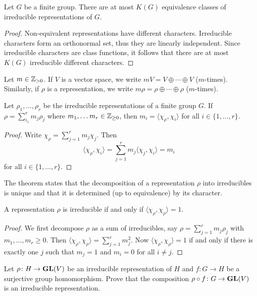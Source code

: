 \begin{corollary}
    Let $G$ be a finite group. There are at most $K(G)$ equivalence classes of irreducible representations of $G$.
\end{corollary}

\begin{proof}
    Non-equivalent representations have different characters. 
    Irreducible characters 
    form an orthonormal set, thus they are linearly 
    independent. Since irreducible characters
    are class functions, it follows that there are at most $K(G)$ irreducible different characters.  
\end{proof}

Let $m\in\mathbb{Z}_{>0}$. If $V$ is a vector space, we 
write $mV=V\oplus\cdots\oplus V$ ($m$-times). Similarly,
if $\rho$ is a representation, 
we write $m\rho=\rho\oplus\cdots\oplus\rho$ ($m$-times). 

\begin{theorem}
    Let $\rho_1,\dots,\rho_r$ be the irreducible representations of a finite group $G$. If 
	$\rho=\sum_{i_1}^rm_j\rho_j$ where $m_1,\dots m_r\in\mathbb{Z}_{\geq0}$, then
    $m_i=\langle \chi_\rho,\chi_i\rangle$ for all $i\in\{1,\dots,r\}$. 
\end{theorem}

\begin{proof}
    Write $\chi_\rho=\sum_{j=1}^rm_j\chi_j$. Then
    \[
    \langle\chi_\rho,\chi_i\rangle=\sum_{j=1}^rm_j\langle\chi_j,\chi_i\rangle=m_i
    \]
    for all $i\in\{1,\dots,r\}$.
\end{proof}

The theorem states that the decomposition of a representation $\rho$ into irreducibles 
is unique and that it is determined (up to equivalence) by its character.

\begin{corollary}
    A representation $\rho$ is irreducible if and only if $\langle\chi_\rho,\chi_\rho\rangle=1$.
\end{corollary}

\begin{proof}
    We first decompose $\rho$ as a sum of irreducibles, say $\rho=\sum_{j=1}^rm_j\rho_j$ with $m_1,\dots,m_r\geq0$. Then
    $\langle\chi_\rho,\chi_\rho\rangle=\sum_{j=1}^rm_j^2$. Now $\langle\chi_\rho,\chi_\rho\rangle=1$ if and only if
    there is exactly one $j$ such that $m_j=1$ and $m_i=0$ for all $i\ne j$.  
\end{proof}

\begin{exercise}
    Let $\rho\colon H\to\mathbf{GL}(V)$ be an irreducible
    representation of $H$ and 
    $f\colon G\to H$ be a surjective group homomorphism. Prove that the composition $\rho\circ f\colon G\to\mathbf{GL}(V)$ is an irreducible representation. 
\end{exercise}

